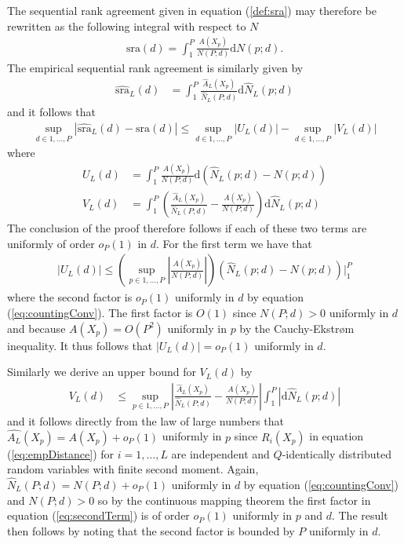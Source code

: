 \documentclass[12pt,a4paper]{article}
\theoremstyle{plain}
\begin{document}
The sequential rank agreement given in equation
(\ref{def:sra}) may therefore be rewritten as the following integral
with respect to $N$
\begin{align}
  \textrm{sra}(d) = \int_{1}^P \frac{A(X_p)}{N(P; d)}\mathrm dN(p; d).
\end{align}
The empirical sequential rank agreement is similarly given by
\begin{align}
  \widehat{\textrm{sra}}_L(d) &= \int_1^P \frac{\widehat{A}_L(X_p)}{\widehat{N}_L(P; d)}\mathrm d \widehat{N}_L(p; d) 
\end{align}
and it follows that
\begin{align}
  \sup_{d \in 1,\ldots,P}\left|\widehat{\textrm{sra}}_L(d) - \textrm{sra}(d)\right| \leq \sup_{d \in 1,\ldots,P}\left|U_L(d)\right| - \sup_{d \in 1,\ldots,P}\left|V_L(d)\right|
\end{align}
where
\begin{align}
  U_L(d) &= \int_1^P\frac{A(X_p)}{N(P;d)} \mathrm d\left(\widehat{N}_L(p; d) - N(p; d)\right)\\
  V_L(d) &=  \int_1^P \left(\frac{\widehat{A}_L(X_p)}{\widehat{N}_L(P; d)} - \frac{A(X_p)}{N(P;d)}\right)\mathrm d\widehat{N}_L(p; d)
\end{align}
The conclusion of the proof therefore follows if each of these two
terms are uniformly of order $o_P(1)$ in $d$.  For the first term we
have that
\begin{align}
  \left|U_L(d)\right| \leq \left(\sup_{p \in 1,\ldots,P}\left|\frac{A(X_p)}{N(P;d)}\right|\right)\left(\widehat{N}_L(p; d) - N(p; d)\right)\biggr\rvert_1^P
\end{align}
where the second factor is $o_P(1)$ uniformly in $d$ by equation
(\ref{eq:countingConv}). The first factor is $O(1)$ since $N(P;d)>0$
uniformly in $d$ and because $A(X_p) = O(P^2)$ uniformly in $p$ by the Cauchy-Ekstr{\o}m inequality. It
thus follows that $\left|U_L(d)\right| = o_P(1)$ uniformly in $d$.

Similarly we derive an upper bound for $V_L(d)$ by
\begin{align}
 V_L(d) &\leq \sup_{p \in 1,\ldots,P}\left|\frac{\widehat{A}_L(X_p)}{\widehat{N}_L(P; d)} - \frac{A(X_p)}{N(P;d)}\right| \int_1^P \left|\mathrm d\widehat{N}_L(p; d)\right|\label{eq:secondTerm}
\end{align}
and it follows directly from the law of large numbers that
$\widehat{A_L}(X_p) = A(X_p) + o_P(1)$ uniformly in $p$ since
$R_i(X_p)$ in equation (\ref{eq:empDistance}) for $i=1,\ldots,L$ are
independent and $Q$-identically distributed random variables with
finite second moment. Again, $\widehat{N}_L(P; d) = N(P;d) + o_P(1)$ uniformly in $d$ by equation
(\ref{eq:countingConv}) and $N(P;d)>0$ so by the continuous mapping theorem the first factor
in equation (\ref{eq:secondTerm}) is of order $o_P(1)$ uniformly in
$p$ and $d$. The result then follows by noting that the second factor
is bounded by $P$ uniformly in $d$. 
\end{document}
